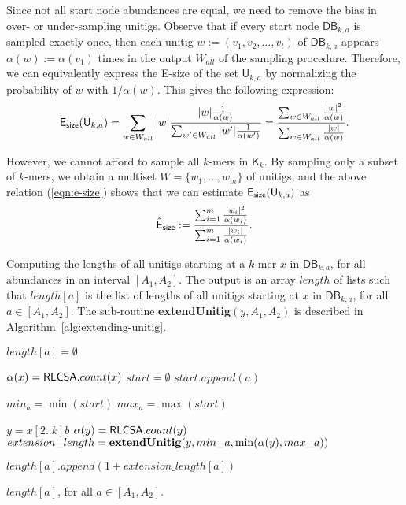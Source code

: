 \documentclass[a4paper,11pt]{article}
\newcommand{\DB}{\mathsf{DB}_{k,a}}
\newcommand{\U}{\mathsf{U}_{k,a}}
\newcommand{\K}{\mathsf{K}}
\newcommand{\abu}{\alpha}
\newcommand{\esize}{{\sf E_{size}}}
\newcommand{\isstart}{{\sf isStart}_{k,a}}
\newcommand{\RLCSA}{{\sf RLCSA}}
\renewcommand{\leq}{\leqslant}
\begin{document}
Since not all start node abundances are equal, we need to remove the bias in over- or under-sampling unitigs. Observe that if every start node $\DB$ is sampled exactly once, then each unitig $w := (v_1,v_2,\dots,v_t)$ of $\DB$ appears $\abu(w) := \abu(v_1)$ times in the output $W_{all}$ of the sampling procedure. Therefore, we can equivalently express the E-size of the set $\U$ by normalizing the probability of $w$ with $1/\abu(w)$. This gives the following expression:
\begin{equation}
\esize(\U) = \sum_{w \in W_{all}} |w| \frac{|w|\frac{1}{\alpha(w)}}{\sum_{w' \in W_{all}}|w'|\frac{1}{\alpha(w')}} = \frac{\sum_{w \in W_{all}}\frac{|w|^2}{\alpha(w)}}{\sum_{w \in W_{all}}\frac{|w|}{\alpha(w)}}.
\label{eqn:e-size}
\end{equation}

However, we cannot afford to sample all $k$-mers in $\K_k$. By sampling only a subset of $k$-mers, we obtain a multiset $W = \{w_1,\dots,w_m\}$ of unitigs, and the above relation (\ref{eqn:e-size}) shows that we can estimate $\esize(\U)$ as 
\[\hat{{\sf E}}_{\sf size} := \frac{\sum_{i = 1}^{m}\frac{|w_i|^2}{\alpha(w_i)}}{\sum_{i=1}^{m}\frac{|w_i|}{\alpha(w_i)}}.\]

\begin{algorithm}[h]
\caption{Computing the lengths of all unitigs starting at a $k$-mer $x$ in $\DB$, for all abundances in an interval $[A_1,A_2]$. The output is an array $length$ of lists such that $length[a]$ is the list of lengths of all unitigs starting at $x$ in $\DB$, for all $a \in [A_1,A_2]$. The sub-routine {\bf extendUnitig}$(y,A_1,A_2)$ is described in Algorithm~\ref{alg:extending-unitig}.\label{alg:sampling-for-esize}}


{
	$length[a] = \emptyset$\;
}

$\abu(x) = \RLCSA.count(x)$\;
$start = \emptyset$\;
{
	\If{$\isstart(x)$ {\bf and} $a \leq \abu(x)$}
	{
		$start.append(a)$\;
	}
}
{
	$min_a = \min(start)$\;
	$max_a = \max(start)$\;

    {
    	$y = x[2..k]b$\;
    	$\abu(y) = \RLCSA.count(y)$\;
    	$extension\_length = {\bf extendUnitig}(y,min\_a, \min(\abu(y),max\_a))$\;
	
    	{
			\If{$a \leq \min(\abu(y),max\_a)$}
			{
				$length[a].append(1 + extension\_length[a])$
			}
			
    		
    	}
    }
}
\Return $length[a]$, for all $a \in [A_1,A_2]$.
\end{algorithm}
\end{document}

